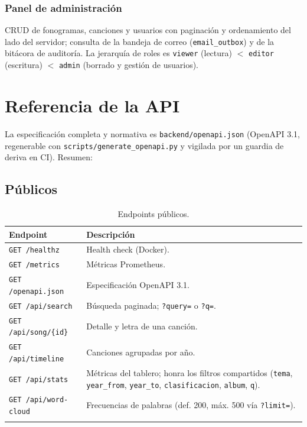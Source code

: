 \documentclass[11pt,letterpaper,twoside]{report}
\newcommand{\codigo}[1]{\texttt{#1}}
\begin{document}
\subsection{Panel de administración}
CRUD de fonogramas, canciones y usuarios con paginación y ordenamiento
del lado del servidor; consulta de la bandeja de correo
(\codigo{email_outbox}) y de la bitácora de auditoría. La jerarquía de
roles es \codigo{viewer} (lectura) $<$ \codigo{editor} (escritura) $<$
\codigo{admin} (borrado y gestión de usuarios).

\chapter{Referencia de la API}
\label{cap:api}

La especificación completa y normativa es
\codigo{backend/openapi.json} (OpenAPI 3.1, regenerable con
\codigo{scripts/generate_openapi.py} y vigilada por un guardia de
deriva en CI). Resumen:

\section{Públicos}
\begin{longtable}{p{4.6cm}p{9.8cm}}
  \toprule
  \textbf{Endpoint} & \textbf{Descripción} \\
  \midrule
  \endhead
  \codigo{GET /healthz}     & Health check (Docker). \\
  \codigo{GET /metrics}     & Métricas Prometheus. \\
  \codigo{GET /openapi.json}& Especificación OpenAPI 3.1. \\
  \codigo{GET /api/search}  & Búsqueda paginada; \codigo{?query=} o \codigo{?q=}. \\
  \codigo{GET /api/song/\{id\}} & Detalle y letra de una canción. \\
  \codigo{GET /api/timeline}& Canciones agrupadas por año. \\
  \codigo{GET /api/stats}   & Métricas del tablero; honra los filtros
    compartidos (\codigo{tema}, \codigo{year_from}, \codigo{year_to},
    \codigo{clasificacion}, \codigo{album}, \codigo{q}). \\
  \codigo{GET /api/word-cloud} & Frecuencias de palabras (def. 200,
    máx. 500 vía \codigo{?limit=}). \\
  \bottomrule
  \caption{Endpoints públicos.}
  \label{tab:api-publica}
\end{longtable}
\end{document}
